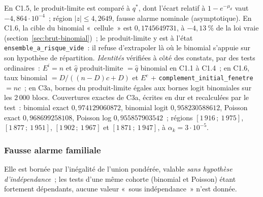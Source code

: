 \documentclass[a4paper,11pt]{article}
\newcommand{\code}[1]{\texttt{\small #1}}
\begin{document}
\noindent
En C1.5, le produit-limite est comparé à $q^{*}$, dont l'écart relatif à
$1 - e^{-\mu_d}$ vaut $-4{,}864 \cdot 10^{-4}$~; région
$|z| \le 4{,}2649$, fausse alarme nominale (asymptotique). En C1.6, la cible
du binomial «~cellule~» est $0{,}1745649731$, à $-4{,}13~\%$ de la loi vraie
(section~\ref{sec:brut-binomial})~; le produit-limite y est à l'état
\code{ensemble\_a\_risque\_vide}~: il refuse d'extrapoler là où le binomial
s'appuie sur son hypothèse de répartition. \emph{Identités} vérifiées à côté
des constats, par des tests ordinaires~: $E^i = n$ et $\hat q$ produit-limite
$= \hat q$ binomial en C1.1 à C1.4~; en C1.6, taux binomial $= D/((n -
D)c + D)$ et $E^c$ + \code{complement\_initial\_fenetre} $= nc$~; en C3a,
bornes du produit-limite égales aux bornes logit binomiales sur les
$2\,000$ blocs. Couvertures exactes de C3a, écrites en dur et recalculées
par le test~: binomial exact $0{,}974129060872$, binomial logit
$0{,}958230588612$, Poisson exact $0{,}968699258108$, Poisson log
$0{,}955857903542$~; régions $[1\,916\,;\ 1\,975]$, $[1\,877\,;\ 1\,951]$,
$[1\,902\,;\ 1\,967]$ et $[1\,871\,;\ 1\,947]$, à $\alpha_k = 3 \cdot
10^{-5}$.

\subsubsection*{Fausse alarme familiale}

Elle est bornée par l'inégalité de l'union pondérée, valable \emph{sans
hypothèse d'indépendance}~; les tests d'une même cohorte (binomial et
Poisson) étant fortement dépendants, aucune valeur «~sous indépendance~»
n'est donnée.
\end{document}
